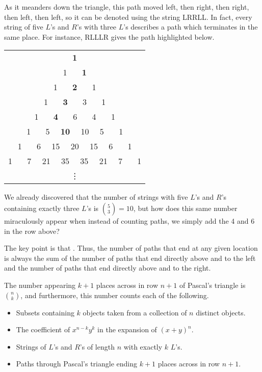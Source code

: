 As it meanders down the triangle, this path moved left, then right, then right, then left, then left, so it can be denoted using the string LRRLL. In fact, every string of five $L$'s and $R$'s with three $L$'s describes a path which terminates in the same place. For instance, RLLLR gives the path highlighted below.

\begin{center}
\begin{tabular}{c}
\textbf{1} \\
1 \ \ \ \textbf{1} \\
1 \ \ \ \textbf{2} \ \ \ 1 \\
1 \ \ \ \textbf{3} \ \ \ 3  \ \ \ 1 \\
1 \ \ \ \textbf{4} \ \ \ 6 \ \ \ 4  \ \ \ 1 \\
1 \ \ \ 5 \, \ \textbf{10} \ \ 10  \, \ 5  \ \ \ 1 \\
1 \ \ \ 6 \, \ 15 \ \ 20 \ \  15 \, \ 6 \ \ \ 1 \\
1 \ \ \ 7 \, \ 21 \ \ 35 \ \ 35  \ \  21 \, \ 7 \ \ \ 1 \\
\vdots
\end{tabular}
\end{center}

We already discovered that the number of strings with five $L$'s and $R$'s containing exactly three $L$'s is $\binom{5}{3}= 10$, but how does this same number miraculously appear when instead of counting paths, we simply add the 4 and 6 in the row above?
\par
The key point is that . Thus, the number of paths that end at any given location is always the sum of the number of paths that end directly above and to the left and the number of paths that end directly above and to the right.

\begin{prop} The number appearing $k+1$ places across in row $n+1$ of Pascal's triangle is $\binom{n}{k}$, and furthermore, this number counts each of the following.
\vspace{-0.75em}
\begin{itemize}
\item Subsets containing $k$ objects taken from a collection of $n$ distinct objects.
\item The coefficient of $x^{n-k}y^k$ in the expansion of $(x+y)^n$.
\item Strings of $L$'s and $R$'s of length $n$ with exactly $k$ $L$'s. 
\item Paths through Pascal's triangle ending $k+1$ places across in row $n+1$.
\end{itemize}
\end{prop}

